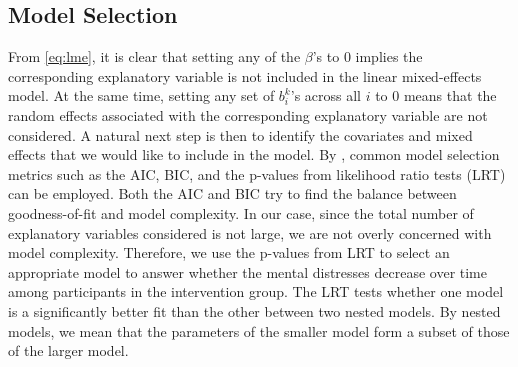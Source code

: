 \subsection{Model Selection}
\begin{table}
\caption{P values of Likelihood Ratio tests between models with different covariates under the intervention group}
\label{tab:model.comp.treatment.lrt}
\end{table}
From \cref{eq:lme}, it is clear that setting any of the $\beta$'s to 0 implies the corresponding explanatory variable is not included in the linear mixed-effects model. At the same time, setting any set of $b_i^k$'s across all $i$ to 0 means that the random effects associated with the corresponding explanatory variable are not considered. A natural next step is then to identify the covariates and mixed effects that we would like to include in the model. By \cite{wu2009mixed}, common model selection metrics such as the AIC, BIC, and the p-values from likelihood ratio tests (LRT) can be employed. Both the AIC and BIC try to find the balance between goodness-of-fit and model complexity. In our case, since the total number of explanatory variables considered is not large, we are not overly concerned with model complexity. Therefore, we use the p-values from LRT to select an appropriate model to answer whether the mental distresses decrease over time among participants in the intervention group. The LRT tests whether one model is a significantly better fit than the other between two nested models. By nested models, we mean that the parameters of the smaller model form a subset of those of the larger model.\\\\
